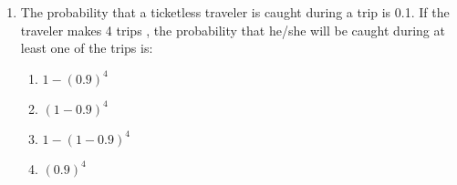 \renewcommand{\theequation}{\theenumi}
\renewcommand{\thefigure}{\theenumi}
\begin{enumerate}[label=\thesection.\arabic*.,ref=\thesection.\theenumi]

\item The probability that a ticketless traveler is caught during a trip is 0.1. If the traveler makes 4 trips , the probability that he/she will be caught during at least one of the trips is:\\
\begin{enumerate}
    \item $1-(0.9)^4$
    \item $(1-0.9)^4$
    \item $1-(1-0.9)^4$
    \item $(0.9)^4$
\end{enumerate}
\solution



\end{enumerate}
